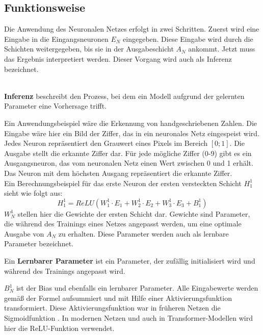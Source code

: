 \subsection{Funktionsweise}
Die Anwendung des Neuronalen Netzes erfolgt in zwei Schritten.
Zuerst wird eine Eingabe in die Eingangsneuronen $E_N$ eingegeben.
Diese Eingabe wird durch die Schichten weitergegeben, bis sie in der Ausgabeschicht $A_N$ ankommt.
Jetzt muss das Ergebnis interpretiert werden. Dieser Vorgang wird auch als Inferenz bezeichnet.\\\
\begin{definition}\label{def:inferenz}
    \textbf{Inferenz} beschreibt den Prozess, bei dem ein Modell aufgrund der gelernten Parameter eine Vorhersage trifft.
\end{definition}

Ein Anwendungsbeispiel wäre die Erkennung von handgeschriebenen Zahlen.
Die Eingabe wäre hier ein Bild der Ziffer, das in ein neuronales Netz eingespeist wird.
Jedes Neuron repräsentiert den Grauwert eines Pixels im Bereich $[0;1]$.
Die Ausgabe stellt die erkannte Ziffer dar.
Für jede mögliche Ziffer (0-9) gibt es ein Ausgangsneuron, das vom neuronalen Netz einen Wert zwischen 0 und 1 erhält.
Das Neuron mit dem höchsten Ausgang repräsentiert die erkannte Ziffer.\\

Ein Berechnungsbeispiel für das erste Neuron der ersten versteckten Schicht $H^1_1$ sieht wie folgt aus:
\begin{equation}
    H^1_1=ReLU(W^1_1\cdot E_1 + W^1_2\cdot E_2 + W^1_3\cdot E_3 + B^1_1)
\end{equation}
$W^1_N$ stellen hier die Gewichte der ersten Schicht dar.
Gewichte sind Parameter, die während des Trainings eines Netzes angepasst werden, um eine optimale Ausgabe von $A_N$ zu erhalten.
Diese Parameter werden auch als lernbare Parameter bezeichnet.\\

\begin{definition}\label{def:lernbare-parameter}
    Ein \textbf{Lernbarer Parameter} ist ein Parameter, der zufällig initialisiert wird und während des Trainings angepasst wird.
\end{definition}

$B^1_N$ ist der Bias und ebenfalls ein lernbarer Parameter.
Alle Eingabewerte werden gemäß der Formel aufsummiert und mit Hilfe einer Aktivierungsfunktion transformiert.
Diese Aktivierungsfunktion war in früheren Netzen die Sigmoidfunktion \pcref{img:sigmoid}.
In modernen Netzen und auch in Transformer-Modellen wird hier die ReLU-Funktion  verwendet.

